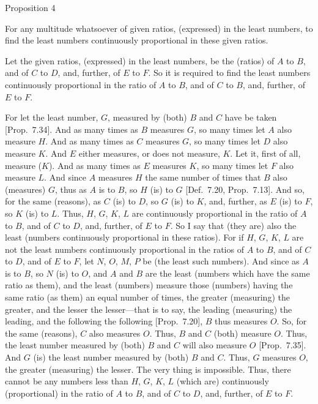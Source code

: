 \begin{center}
{\large Proposition 4}
\end{center}

For any multitude whatsoever of given ratios, (expressed) in the least numbers, to find the least numbers continuously proportional 
in these given ratios.

\epsfysize=1.7in
\centerline{}

Let the given ratios, (expressed) in the least numbers, be the (ratios) of
$A$ to $B$, and of $C$ to $D$, and, further,  of $E$ to $F$. So it is
required to find the least numbers continuously proportional  in the
ratio of $A$ to $B$, and  of $C$ to $B$, and, further,
 of $E$ to $F$.
 
For let the least number, $G$,  measured by (both) $B$ and $C$ have
be taken [Prop.~7.34]. And as many times
as $B$ measures $G$, so many times let $A$ also measure $H$.
And as many times as $C$ measures $G$, so many times let
$D$ also measure $K$. And $E$ either measures, or does not measure, $K$.
Let it, first of all, measure ($K$). And as many times as $E$ measures
$K$, so many times let $F$ also measure $L$. And since $A$
measures $H$ the same number of times that $B$ also (measures) $G$, thus as $A$ is to $B$, so $H$ (is) to $G$ [Def.~7.20, Prop.~7.13].
And so, for the same (reasons), as $C$ (is) to $D$, so
$G$ (is) to $K$, and, further, as $E$ (is) to $F$, so $K$ (is) to $L$.
Thus, $H$, $G$, $K$, $L$ are continuously proportional in the ratio
of $A$ to $B$, and of $C$ to $D$, and, further,  of $E$ to $F$. So I say that (they are) also the least
(numbers continuously proportional in these ratios). For if
$H$, $G$, $K$, $L$ are not the least numbers continuously proportional
 in the ratios of $A$ to $B$, and of $C$ to $D$, and of
$E$ to $F$, let $N$, $O$, $M$, $P$ be (the least such numbers). 
And since as $A$ is to $B$, so $N$ (is) to $O$, and $A$ and $B$ are the
least (numbers which have the same ratio as them), and the least (numbers) measure those (numbers)
having the same ratio (as them) an equal number of times, the greater (measuring) the greater, and the lesser the lesser---that is to say, the leading (measuring) the leading, and the
following the following [Prop.~7.20], $B$ thus
measures $O$. So, for the same (reasons), $C$ also measures $O$. Thus,
$B$ and $C$ (both) measure $O$. Thus, the least number measured by
(both) $B$ and $C$ will also measure $O$ [Prop.~7.35]. And $G$ (is) the least number measured by (both) $B$ and $C$. Thus, $G$ measures $O$, the greater
(measuring) the lesser. The very thing is impossible. Thus, there
cannot be any numbers less than $H$, $G$, $K$, $L$ 
(which are) continuously (proportional) in the ratio of $A$ to $B$, and of $C$ to $D$, and, further, of $E$ to $F$.

